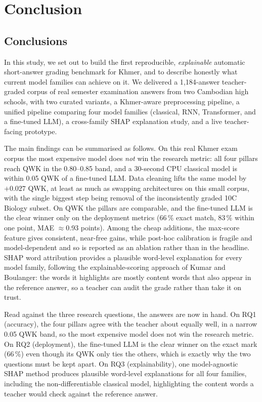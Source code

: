 \chapter{Conclusion}
\label{ch:conclusion}

\section{Conclusions}
\label{sec:conclusions}
In this study, we set out to build the first reproducible, \emph{explainable} automatic short-answer
grading benchmark for Khmer, and to describe honestly what current model families can achieve on it. We
delivered a 1{,}184-answer teacher-graded corpus of real semester examination answers from two
Cambodian high schools, with two curated variants, a Khmer-aware preprocessing pipeline, a unified
pipeline comparing four model families (classical, RNN, Transformer, and a fine-tuned LLM), a
cross-family SHAP explanation study, and a live teacher-facing prototype.

The main findings can be summarised as follows. On this real Khmer exam corpus the most expensive model
does \emph{not} win the research metric: all four pillars reach QWK in the 0.80--0.85 band, and a
30-second CPU classical model is within 0.05 QWK of a fine-tuned LLM. Data cleaning lifts the same model
by $+0.027$ QWK, at least as much as swapping architectures on this small corpus, with the single biggest
step being removal of the inconsistently graded 10C Biology subset. On QWK the pillars are comparable,
and the fine-tuned LLM is the clear winner only on the deployment metrics (66\,\% exact match, 83\,\%
within one point, MAE $\approx$0.93 points). Among the cheap additions, the max-score feature gives
consistent, near-free gains, while post-hoc calibration is fragile and model-dependent and so is reported
as an ablation rather than in the headline. SHAP word attribution provides a plausible word-level
explanation for every model family, following the explainable-scoring approach of Kumar and Boulanger:
the words it highlights are mostly content words that also appear in the reference answer, so a teacher
can audit the grade rather than take it on trust.

Read against the three research questions, the answers are now in hand. On RQ1 (accuracy), the four
pillars agree with the teacher about equally well, in a narrow 0.05 QWK band, so the most expensive model
does not win the research metric. On RQ2 (deployment), the fine-tuned LLM is the clear winner on the
exact mark (66\,\%) even though its QWK only ties the others, which is exactly why the two questions must
be kept apart. On RQ3 (explainability), one model-agnostic SHAP method produces plausible
word-level explanations for all four families, including the non-differentiable classical model,
highlighting the content words a teacher would check against the reference answer.

